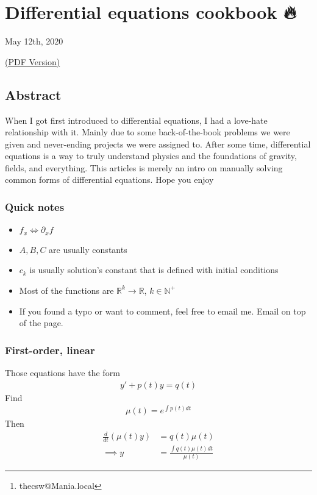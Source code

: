 \documentclass[12pt]{article}
\author{Sandy Urazayev\thanks{thecsw@Mania.local}}
\date{\today}
\title{}
\begin{document}
\section*{Differential equations cookbook 🔥}
\label{sec:orgaf454c9}

May 12th, 2020

\href{./index.pdf}{(PDF Version)}

\subsection*{Abstract}
\label{sec:org4e916c7}
When I got first introduced to differential equations, I had a love-hate
relationship with it. Mainly due to some back-of-the-book problems we were given
and never-ending projects we were assigned to. After some time, differential
equations is a way to truly understand physics and the foundations of gravity,
fields, and everything. This articles is merely an intro on manually solving
common forms of differential equations. Hope you enjoy

\subsubsection*{Quick notes}
\label{sec:org25d3dfd}
\begin{itemize}
\item \(f_x \iff \partial_x f\)
\item \(A,B,C\) are usually constants
\item \(c_k\) is usually solution's constant that is defined with initial conditions
\item Most of the functions are \(\mathbb{R}^k \to \mathbb{R}\), \(k \in \mathbb{N}^+\)
\item If you found a typo or want to comment, feel free to email me. Email on top of
the page.
\end{itemize}

\subsubsection*{First-order, linear}
\label{sec:org5d76057}
Those equations have the form
\begin{align*}
	y' + p(t) y = q(t)
\end{align*}
Find
\begin{align*}
	\mu(t) = e^{\int p(t) dt}
\end{align*}
Then
\begin{align*}
	\frac{d}{dt}(\mu(t)y) & = q(t) \mu(t)                        \\
	\implies y            & = \frac{\int q(t) \mu(t) dt}{\mu(t)}
\end{align*}
\end{document}
